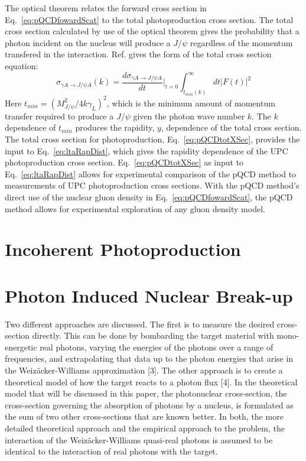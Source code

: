     The optical theorem relates the forward cross section in 
      Eq.~\ref{eq:pQCDfowardScat} to the total photoproduction cross section. 
    The total cross section calculated by use of the optical theorem gives 
      the probability that a photon incident on the nucleus will produce a 
      $J/\psi$ regardless of the momentum transfered in the interaction. 
    Ref. \cite{pQCD2011.08} gives the form of the total cross section equation:
    \begin{equation} \label{eq:pQCDtotXSec}
      \sigma_{\gamma A\rightarrow J/\psi A}(k)=
      \frac{d\sigma_{\gamma A\rightarrow J/\psi A}}{dt}\Big|_{t=0}
      \int_{t_{min}(k)}^{\infty}dt|F(t)|^{2}
    \end{equation} 
    Here $t_{min}=(M_{J/\psi}^{2}/4k\gamma_{L})^2$, which is the minimum amount
      of momentum transfer required to produce a $J/\psi$ given the photon wave
      number $k$.
    The $k$ dependence of $t_{min}$ produces the rapidity, $y$, dependence of
      the total cross section.
    The total cross section for photoproduction, Eq.~\ref{eq:pQCDtotXSec}, 
      provides the input to Eq.~\ref{eq:ltaRapDist}, 
      which gives the rapidity dependence of the UPC photoproduction cross 
      section. 
    Eq.~\ref{eq:pQCDtotXSec} as input to Eq.~\ref{eq:ltaRapDist} allows for 
      experimental comparison of the pQCD method to measurements of UPC 
      photoproduction cross sections. 
    With the pQCD method's direct use of the nuclear gluon density in 
      Eq.~\ref{eq:pQCDfowardScat}, the pQCD method allows for experimental 
      exploration of any gluon density model. 


  \section{Incoherent Photoproduction}


  \section{Photon Induced Nuclear Break-up}
    Two different approaches are discussed.
    The first is to measure the desired cross-section directly.
    This can be done by bombarding the target material with mono-energetic real photons, varying the energies of the photons over a range of frequencies, and extrapolating that data up to the photon energies that arise in the Weizäcker-Williams approximation [3].
    The other approach is to create a theoretical model of how the target reacts to a photon flux [4].
    In the theoretical model that will be discussed in this paper, the photonuclear cross-section, the cross-section governing the absorption of photons by a nucleus, is formulated as the sum of two other cross-sections that are known better.
    In both, the more detailed theoretical approach and the empirical approach to the problem, the interaction of the Weizäcker-Williams quasi-real photons is assumed to be identical to the interaction of real photons with the target.

